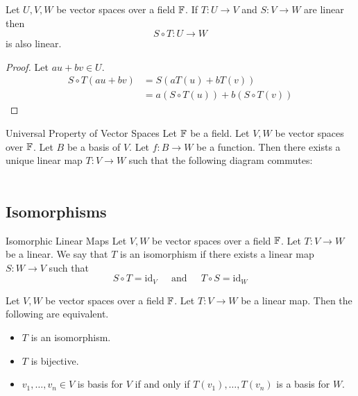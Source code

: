 \documentclass[a4paper]{article}
\begin{document}
\begin{prp}{}{} Let $U,V,W$ be vector spaces over a field $\mathbb{F}$. If $T:U\to V$ and $S:V\to W$ are linear then $$S\circ T:U\to W$$ is also linear. 
\begin{proof} Let $au+bv\in U$. 
\begin{align*}
S\circ T(au+bv)&=S(aT(u)+bT(v))\\
&=a(S\circ T(u))+b(S\circ T(v))
\end{align*}
\end{proof}
\end{prp}

\begin{prp}{Universal Property of Vector Spaces}{} Let $\mathbb{F}$ be a field. Let $V,W$ be vector spaces over $\mathbb{F}$. Let $B$ be a basis of $V$. Let $f:B\to W$ be a function. Then there exists a unique linear map $T:V\to W$ such that the following diagram commutes: \\
 \\
\end{prp}

\subsection{Isomorphisms}
\begin{defn}{Isomorphic Linear Maps}{} Let $V,W$ be vector spaces over a field $\mathbb{F}$. Let $T:V\to W$ be a linear. We say that $T$ is an isomorphism if there exists a linear map $S:W\to V$ such that $$S\circ T=\text{id}_V\;\;\;\;\text{ and }\;\;\;\;T\circ S=\text{id}_W$$
\end{defn}

\begin{prp}{}{} Let $V,W$ be vector spaces over a field $\mathbb{F}$. Let $T:V\to W$ be a linear map. Then the following are equivalent. 
\begin{itemize}
\item $T$ is an isomorphism. 
\item $T$ is bijective. 
\item $v_1,\dots,v_n\in V$ is basis for $V$ if and only if $T(v_1),\dots,T(v_n)$ is a basis for $W$. 
\end{itemize}
\end{prp}
\end{document}

